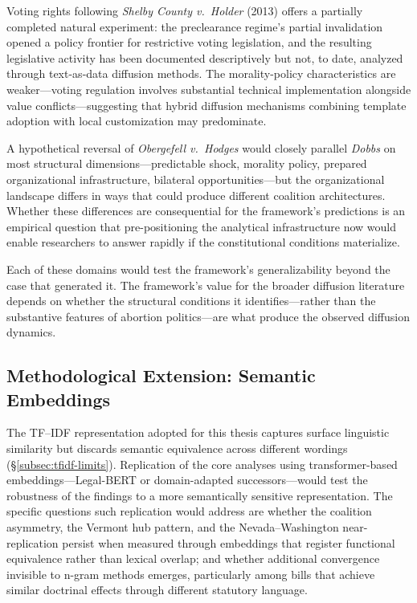 Voting rights following \emph{Shelby County v.\ Holder} (2013) offers a partially completed natural experiment: the preclearance regime's partial invalidation opened a policy frontier for restrictive voting legislation, and the resulting legislative activity has been documented descriptively but not, to date, analyzed through text-as-data diffusion methods. The morality-policy characteristics are weaker---voting regulation involves substantial technical implementation alongside value conflicts---suggesting that hybrid diffusion mechanisms combining template adoption with local customization may predominate.

A hypothetical reversal of \emph{Obergefell v.\ Hodges} would closely parallel \emph{Dobbs} on most structural dimensions---predictable shock, morality policy, prepared organizational infrastructure, bilateral opportunities---but the organizational landscape differs in ways that could produce different coalition architectures. Whether these differences are consequential for the framework's predictions is an empirical question that pre-positioning the analytical infrastructure now would enable researchers to answer rapidly if the constitutional conditions materialize.

Each of these domains would test the framework's generalizability beyond the case that generated it. The framework's value for the broader diffusion literature depends on whether the structural conditions it identifies---rather than the substantive features of abortion politics---are what produce the observed diffusion dynamics.

\subsection{Methodological Extension: Semantic Embeddings}
\label{subsec:future-methodological}

The TF--IDF representation adopted for this thesis captures surface linguistic similarity but discards semantic equivalence across different wordings (\S\ref{subsec:tfidf-limits}). Replication of the core analyses using transformer-based embeddings---Legal-BERT \parencite{chalkidis-etal-2020-legal,devlinBERTPretrainingDeep2019} or domain-adapted successors---would test the robustness of the findings to a more semantically sensitive representation. The specific questions such replication would address are whether the coalition asymmetry, the Vermont hub pattern, and the Nevada--Washington near-replication persist when measured through embeddings that register functional equivalence rather than lexical overlap; and whether additional convergence invisible to n-gram methods emerges, particularly among bills that achieve similar doctrinal effects through different statutory language.

